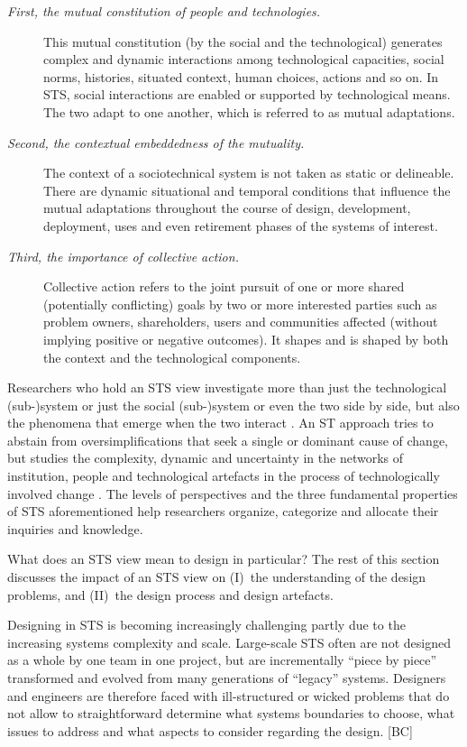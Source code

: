 \begin{description}
\item[\textit{First, the mutual constitution of people and technologies.}] 
This mutual constitution (by the social and the technological) generates complex and dynamic interactions among technological capacities, social norms, histories, situated context, human choices, actions and so on. In STS, social interactions are enabled or supported by technological means. The two adapt to one another, which is referred to as mutual adaptations. 
%
\item[\textit{Second, the contextual embeddedness of the mutuality.}] 
The context of a sociotechnical system is not taken as static or delineable. There are dynamic situational and temporal conditions that influence 
the mutual adaptations throughout the course of design, development, deployment, uses and even retirement phases of the systems of interest. 
%
\item[\textit{Third, the importance of collective action.}] 
Collective action refers to the joint pursuit of one or more shared (potentially conflicting) goals by two or more interested parties such as problem owners, shareholders, users  and communities affected (without implying positive or negative outcomes). It shapes and is shaped by both the context and the technological components. 
\end{description}
%
%
Researchers who hold an STS view investigate more than just the technological (sub-)system or just the social (sub-)system or even the two side by side, but also the phenomena that emerge when the two interact \cite{Lee2001}. An ST approach tries to abstain from oversimplifications that seek a single or dominant cause of change, but studies the complexity, dynamic and uncertainty in the networks of institution, people and technological artefacts in the process of technologically involved change \cite{Sawyer2014}. 
%
The levels of perspectives and the three fundamental properties of STS aforementioned help researchers organize, categorize and allocate their inquiries and knowledge. 

What does an STS view mean to design in particular? The rest of this section discusses the impact of an STS view on (I)~the understanding of the design problems, and (II)~the design process and design artefacts.

 Designing in STS is becoming increasingly challenging partly due to the increasing systems complexity and scale.  
Large-scale STS often are not designed as a whole by one team in one project, but are incrementally ``piece by piece'' transformed and evolved from many generations of ``legacy'' systems. Designers and engineers are therefore faced with ill-structured or wicked problems that do not allow to straightforward determine what systems boundaries to choose, what issues to address and what aspects to consider regarding the design. [BC]

